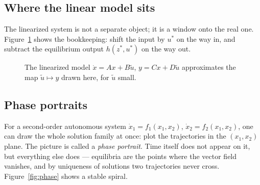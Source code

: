 \documentclass[11pt]{article}
\begin{document}
\subsection{Where the linear model sits}
The linearized system is not a separate object; it is a window onto the real one.
Figure~\ref{fig:lin} shows the bookkeeping: shift the input by $u^{*}$ on the way
in, and subtract the equilibrium output $h(z^{*},u^{*})$ on the way out.

\begin{figure}[htb]
\centering
{}
\caption{The linearized model $\dot x=Ax+B\tilde u$, $y=Cx+D\tilde u$
approximates the map $\tilde u\mapsto y$ drawn here, for $\tilde u$ small.}
\label{fig:lin}
\end{figure}

\subsection{Phase portraits}
For a second-order autonomous system
$\dot x_1 = f_1(x_1,x_2)$, $\dot x_2 = f_2(x_1,x_2)$,
one can draw the whole solution family at once: plot the trajectories in the
$(x_1,x_2)$ plane. The picture is called a \emph{phase portrait}. Time itself does
not appear on it, but everything else does --- equilibria are the points where the
vector field vanishes, and by uniqueness of solutions two trajectories never
cross. Figure~\ref{fig:phase} shows a stable spiral.
\end{document}
